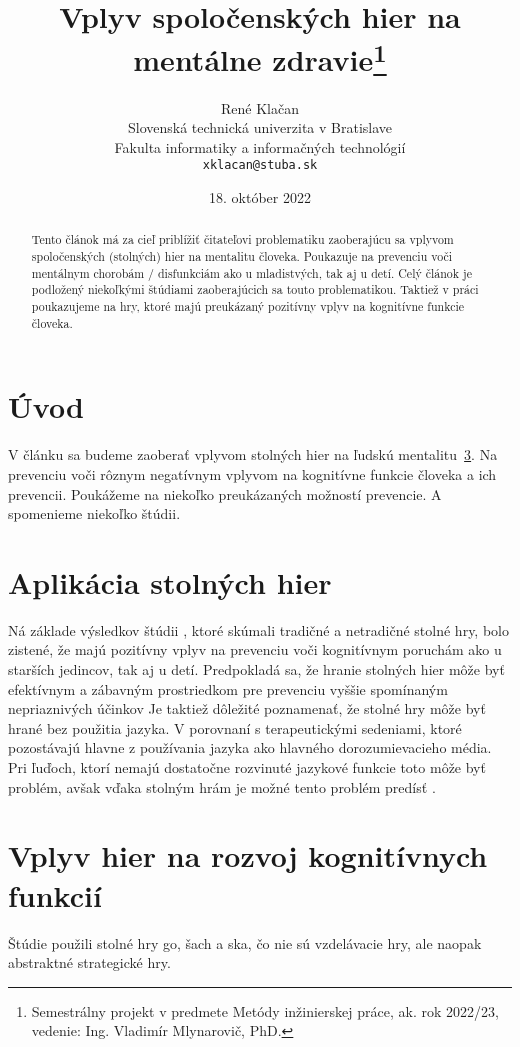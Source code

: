 \documentclass[10pt,oneside,slovak,a4paper]{article}
\title{Vplyv spoločenských hier na mentálne zdravie\thanks{Semestrálny projekt v predmete Metódy inžinierskej práce, ak. rok 2022/23, vedenie: Ing. Vladimír Mlynarovič, PhD.}} %
\author{René Klačan\\[2pt]
	{\small Slovenská technická univerzita v Bratislave}\\
	{\small Fakulta informatiky a informačných technológií}\\
	{\small \texttt{xklacan@stuba.sk}}
	}
\date{\small 18. október 2022}
\begin{document}
\maketitle
\begin{abstract}
Tento článok má za cieľ priblížiť čitateľovi problematiku zaoberajúcu sa vplyvom spoločenských (stolných) hier na mentalitu človeka. Poukazuje na prevenciu voči mentálnym chorobám / disfunkciám ako u mladistvých, tak aj u detí. Celý článok je podložený niekoľkými štúdiami zaoberajúcich sa touto problematikou. Taktiež v práci poukazujeme na hry, ktoré majú preukázaný pozitívny vplyv na kognitívne funkcie človeka.
\end{abstract}

\section{Úvod}
V článku sa budeme zaoberať vplyvom stolných hier na ľudskú mentalitu~\ref{hry_kognitivne_funkcie}. Na prevenciu voči rôznym negatívnym vplyvom na kognitívne funkcie človeka a ich prevencii. Poukážeme na niekoľko preukázaných možností prevencie. A spomenieme niekoľko štúdii.

\section{Aplikácia stolných hier} \label{aplikacie_hier}
Ná základe výsledkov štúdii \cite{Nakao:BG}, ktoré skúmali tradičné a netradičné stolné hry, bolo zistené, že majú pozitívny vplyv na prevenciu voči kognitívnym poruchám ako u starších jedincov, tak aj u detí.
Predpokladá sa, že hranie stolných hier môže byť efektívnym a zábavným prostriedkom pre prevenciu vyššie spomínaným nepriaznivých účinkov \cite{Edu:GFH}
Je taktiež dôležité poznamenať, že stolné hry môže byť hrané bez použitia jazyka. V porovnaní s terapeutickými sedeniami, ktoré pozostávajú hlavne z používania jazyka ako hlavného dorozumievacieho média. Pri ľuďoch, ktorí nemajú dostatočne rozvinuté jazykové funkcie toto môže byť problém, avšak vďaka stolným hrám je možné tento problém predísť \cite{Charlier:2013}.

\section{Vplyv hier na rozvoj kognitívnych funkcií} \label{hry_kognitivne_funkcie}
Štúdie \cite{Panphunpho:2013} použili stolné hry go, šach a ska, čo nie sú vzdelávacie hry, ale naopak abstraktné strategické hry.
\end{document}
